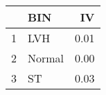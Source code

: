 \begin{table}[ht]
\centering
\begin{tabular}{rlr}
  \hline
 & BIN & IV \\ 
  \hline
1 & LVH & 0.01 \\ 
  2 & Normal & 0.00 \\ 
  3 & ST & 0.03 \\ 
   \hline
\end{tabular}
\end{table}
